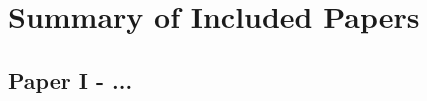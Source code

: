 
\chapter{Summary of Included Papers}
\label{chap:summary_of_included_papers}

\noindent \lipsum[1]

\section{Paper I - ...}
\label{sec:paper1}